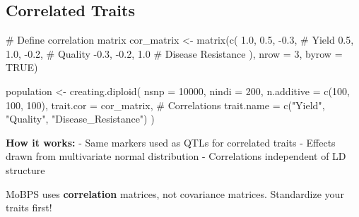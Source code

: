 \documentclass[
  letterpaper,
]{book}
\newenvironment{Shaded}{\begin{snugshade}}{\end{snugshade}}
\newcommand{\AttributeTok}[1]{\textcolor[rgb]{0.40,0.45,0.13}{#1}}
\newcommand{\CommentTok}[1]{\textcolor[rgb]{0.37,0.37,0.37}{#1}}
\newcommand{\ConstantTok}[1]{\textcolor[rgb]{0.56,0.35,0.01}{#1}}
\newcommand{\DecValTok}[1]{\textcolor[rgb]{0.68,0.00,0.00}{#1}}
\newcommand{\FloatTok}[1]{\textcolor[rgb]{0.68,0.00,0.00}{#1}}
\newcommand{\FunctionTok}[1]{\textcolor[rgb]{0.28,0.35,0.67}{#1}}
\newcommand{\NormalTok}[1]{\textcolor[rgb]{0.00,0.23,0.31}{#1}}
\newcommand{\OtherTok}[1]{\textcolor[rgb]{0.00,0.23,0.31}{#1}}
\newcommand{\SpecialCharTok}[1]{\textcolor[rgb]{0.37,0.37,0.37}{#1}}
\newcommand{\StringTok}[1]{\textcolor[rgb]{0.13,0.47,0.30}{#1}}
\begin{document}
\subsection{Correlated Traits}\label{correlated-traits}

\begin{Shaded}
\begin{Highlighting}[]
\CommentTok{\# Define correlation matrix}
\NormalTok{cor\_matrix }\OtherTok{\textless{}{-}} \FunctionTok{matrix}\NormalTok{(}\FunctionTok{c}\NormalTok{(}
  \FloatTok{1.0}\NormalTok{,  }\FloatTok{0.5}\NormalTok{, }\SpecialCharTok{{-}}\FloatTok{0.3}\NormalTok{,   }\CommentTok{\# Yield}
  \FloatTok{0.5}\NormalTok{,  }\FloatTok{1.0}\NormalTok{, }\SpecialCharTok{{-}}\FloatTok{0.2}\NormalTok{,   }\CommentTok{\# Quality}
 \SpecialCharTok{{-}}\FloatTok{0.3}\NormalTok{, }\SpecialCharTok{{-}}\FloatTok{0.2}\NormalTok{,  }\FloatTok{1.0}    \CommentTok{\# Disease Resistance}
\NormalTok{), }\AttributeTok{nrow =} \DecValTok{3}\NormalTok{, }\AttributeTok{byrow =} \ConstantTok{TRUE}\NormalTok{)}

\NormalTok{population }\OtherTok{\textless{}{-}} \FunctionTok{creating.diploid}\NormalTok{(}
  \AttributeTok{nsnp =} \DecValTok{10000}\NormalTok{,}
  \AttributeTok{nindi =} \DecValTok{200}\NormalTok{,}
  \AttributeTok{n.additive =} \FunctionTok{c}\NormalTok{(}\DecValTok{100}\NormalTok{, }\DecValTok{100}\NormalTok{, }\DecValTok{100}\NormalTok{),}
  \AttributeTok{trait.cor =}\NormalTok{ cor\_matrix,          }\CommentTok{\# Correlations}
  \AttributeTok{trait.name =} \FunctionTok{c}\NormalTok{(}\StringTok{"Yield"}\NormalTok{, }\StringTok{"Quality"}\NormalTok{, }\StringTok{"Disease\_Resistance"}\NormalTok{)}
\NormalTok{)}
\end{Highlighting}
\end{Shaded}

\textbf{How it works:} - Same markers used as QTLs for correlated traits
- Effects drawn from multivariate normal distribution - Correlations
independent of LD structure

\begin{tcolorbox}[enhanced jigsaw, breakable, coltitle=black, opacitybacktitle=0.6, left=2mm, colframe=quarto-callout-warning-color-frame, toprule=.15mm, colback=white, bottomtitle=1mm, colbacktitle=quarto-callout-warning-color!10!white, opacityback=0, leftrule=.75mm, toptitle=1mm, rightrule=.15mm, arc=.35mm, titlerule=0mm, title=\textcolor{quarto-callout-warning-color}{\faExclamationTriangle}\hspace{0.5em}{Correlation vs.~Covariance}, bottomrule=.15mm]

MoBPS uses \textbf{correlation} matrices, not covariance matrices.
Standardize your traits first!

\end{tcolorbox}
\end{document}

